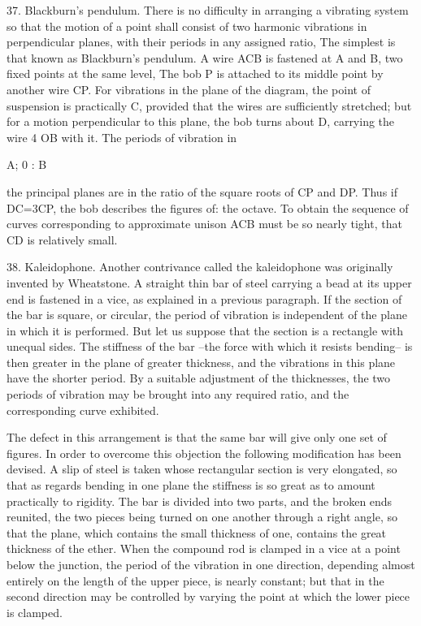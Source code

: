37.  Blackburn's pendulum.  There is no difficulty in arranging a vibrating
system so that the motion of a point shall consist of two harmonic vibrations
in perpendicular planes, with their periods in any assigned ratio, The simplest
is that known as Blackburn's pendulum. A wire ACB is fastened at A and B, two
fixed points at the same level, The bob P is attached to its middle point by
another wire CP. For vibrations in the plane of the diagram, the point of
suspension is practically C, provided that the wires are sufficiently
stretched; but for a motion perpendicular to this plane, the bob turns about D,
carrying the wire 4 OB with it. The periods of vibration in

A; 0 : B

the principal planes are in the ratio of the square roots of CP and DP.  Thus
if DC=3CP, the bob describes the figures of: the octave. To obtain the sequence
of curves corresponding to approximate unison ACB must be so nearly tight, that
CD is relatively small.

38.  Kaleidophone.  Another contrivance called the kaleidophone was originally
invented by Wheatstone. A straight thin bar of steel carrying a bead at its
upper end is fastened in a vice, as explained in a previous paragraph. If the
section of the bar is square, or circular, the period of vibration is
independent of the plane in which it is performed. But let us suppose that the
section is a rectangle with unequal sides. The stiffness of the bar --the force
with which it resists bending-- is then greater in the plane of greater
thickness, and the vibrations in this plane have the shorter period.  By a
suitable adjustment of the thicknesses, the two periods of vibration may be
brought into any required ratio, and the corresponding curve exhibited.

The defect in this arrangement is that the same bar will give only one set of
figures. In order to overcome this objection the following modification has
been devised. A slip of steel is taken whose rectangular section is very
elongated, so that as regards bending in one plane the stiffness is so great as
to amount practically to rigidity.  The bar is divided into two parts, and the
broken ends reunited, the two pieces being turned on one another through a
right angle, so that the plane, which contains the small thickness of one,
contains the great thickness of the ether. When the compound rod is clamped in
a vice at a point below the junction, the period of the vibration in one
direction, depending almost entirely on the length of the upper piece, is
nearly constant; but that in the second direction may be controlled by varying
the point at which the lower piece is clamped.

